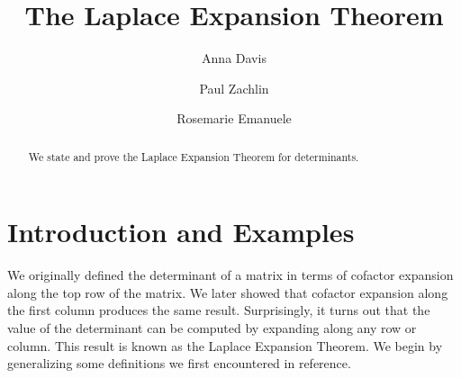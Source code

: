 \documentclass{ximera}
\author{Anna Davis \and Paul Zachlin \and Rosemarie Emanuele} \title{The Laplace Expansion Theorem} \license{CC-BY 4.0}
\begin{document}
\begin{abstract}
We state and prove the Laplace Expansion Theorem for determinants.
\end{abstract}
\maketitle



\section*{Introduction and Examples}
We originally defined the determinant of a matrix in terms of cofactor expansion along the top row of the matrix.  We later showed that cofactor expansion along the first column produces the same result.  Surprisingly, it turns out that the value of the determinant can be computed by expanding along any row or column.  This result is known as the Laplace Expansion Theorem.  We begin by generalizing some definitions we first encountered in {\color{red} reference}.
\end{document}
